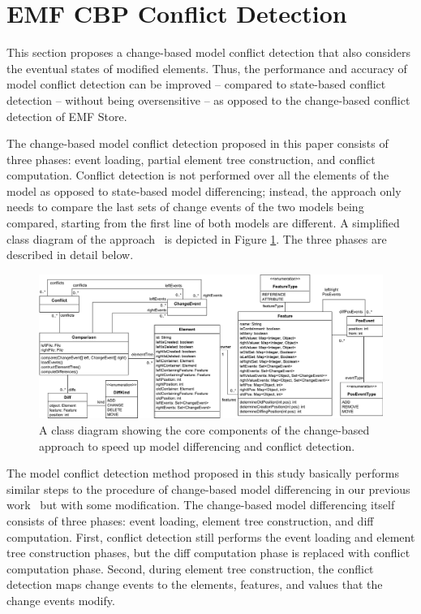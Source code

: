 \section{EMF CBP Conflict Detection}
\label{sec:emf_cbp_conflict_detection}
This section proposes a change-based model conflict detection that also considers the eventual states of modified elements. Thus, the performance and accuracy of model conflict detection can be improved -- compared to state-based conflict detection -- without being oversensitive -- as opposed to the change-based conflict detection of EMF Store.

The change-based model conflict detection proposed in this paper consists of three phases: event loading, partial element tree construction, and conflict computation. Conflict detection is not performed over all the elements of the model as opposed to state-based model differencing; instead, the approach only needs to compare the last sets of change events of the two models being compared, starting from the first line of both models are different. A simplified class diagram of the approach~\cite{epsilonlabs2019emfcbp} is depicted in Figure \ref{fig:approach_class_diagram}. The three phases are described in detail below.

\begin{figure}
\includegraphics[width=\linewidth]{TreeClassDiagram}
\caption{A class diagram showing the core components of the change-based approach to speed up model differencing and conflict detection.}
\label{fig:approach_class_diagram}
\end{figure}

The model conflict detection method proposed in this study basically performs similar steps to the procedure of change-based model differencing in our previous work~\cite{yohannis2019efficient} but with some modification. The change-based model differencing itself consists of three phases: event loading, element tree construction, and diff computation. First, conflict detection still performs the event loading and element tree construction phases, but the diff computation phase is replaced with conflict computation phase. Second, during element tree construction, the conflict detection maps change events to the elements, features, and values that the change events modify. 

